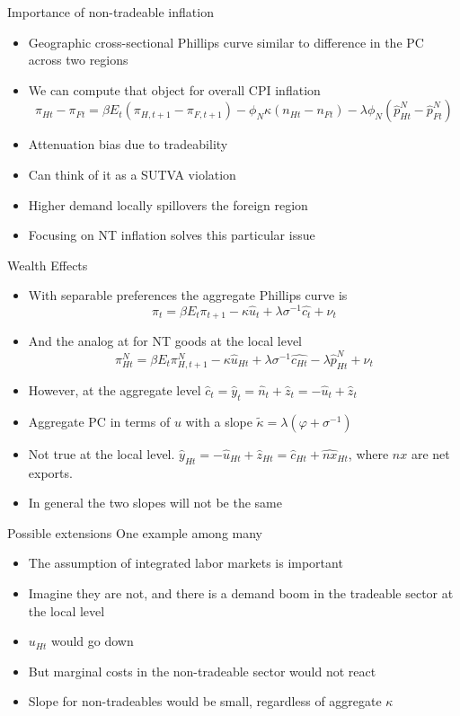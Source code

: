 \documentclass[english,xcolor=svgnames]{beamer}
\begin{document}
\begin{frame}{Importance of non-tradeable inflation}
\begin{itemize}
\item Geographic cross-sectional Phillips curve similar to difference in the PC across two regions
\item We can compute that object for overall CPI inflation
		\[\pi_{Ht} - \pi_{Ft}=\beta E_{t}(\pi_{H,t+1} -\pi_{F,t+1} ) - \phi_N\kappa (n_{Ht} - n_{Ft})  - \lambda\phi_N (\hat{p}^N_{Ht} - \hat{p}^N_{Ft} ) \]
\item Attenuation bias due to tradeability
\item Can think of it as a SUTVA violation
\item Higher demand locally spillovers the foreign region
\item Focusing on NT inflation solves this particular issue
\end{itemize}
\end{frame}


\begin{frame}{Wealth Effects}
\begin{itemize}
\item With separable preferences the aggregate Phillips curve is
	\[ \pi_{t} = \beta E_{t} \pi_{t+1} - \kappa \hat{u}_t + \lambda \sigma^{-1} \hat{c_t} + \nu_{t} \] \vspace{-10pt}
\item And the analog at for NT goods at the local level
	\[ \pi^N_{Ht} = \beta E_{t} \pi^N_{H,t+1} - \kappa \hat{u}_{Ht} + \lambda \sigma^{-1} \hat{c_{Ht}} -\lambda\hat{p}^N_{Ht} + \nu_{t} \] \vspace{-10pt}
\item However, at the aggregate level $\hat{c}_t = \hat{y}_t = \hat{n}_t + \hat{z}_t = -\hat{u}_t + \hat{z}_t$
\item Aggregate PC in terms of $u$ with a slope $\tilde{\kappa} = \lambda(\varphi + \sigma^{-1})$
\item Not true at the local level. $\hat{y}_{Ht} = -\hat{u}_{Ht} + \hat{z}_{Ht} =  \hat{c}_{Ht} + \hat{nx}_{Ht}$, where $nx$ are net exports.
\item In general the two slopes will not be the same
\end{itemize}
\end{frame}

\begin{frame}{Possible extensions} 
One example among many
\begin{itemize}
\item The assumption of integrated labor markets is important
\item Imagine they are not, and there is a demand boom in the tradeable sector at the local level
\item $u_{Ht}$ would go down
\item But marginal costs in the non-tradeable sector would not react
\item Slope for non-tradeables would be small, regardless of aggregate $\kappa$
\end{itemize}
\end{frame}
\end{document}
